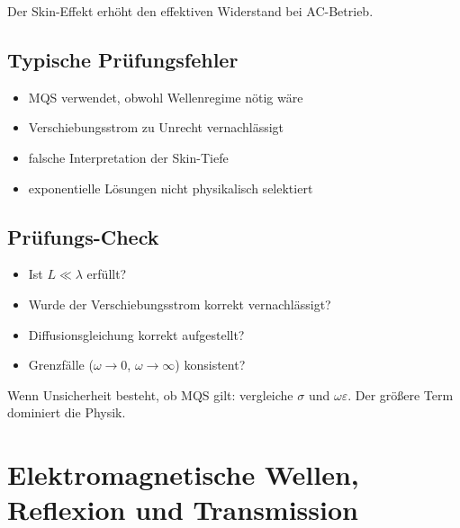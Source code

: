 \documentclass[a4paper]{article}
\newcommand{\eps}{\varepsilon}
\begin{document}
\begin{merke}
Der Skin-Effekt erhöht den effektiven Widerstand bei AC-Betrieb.
\end{merke}

\subsection{Typische Prüfungsfehler}

\begin{abwandlung}
\begin{itemize}
  \item MQS verwendet, obwohl Wellenregime nötig wäre
  \item Verschiebungsstrom zu Unrecht vernachlässigt
  \item falsche Interpretation der Skin-Tiefe
  \item exponentielle Lösungen nicht physikalisch selektiert
\end{itemize}
\end{abwandlung}

\subsection{Prüfungs-Check}

\begin{checkitem}
\begin{itemize}
  \item Ist $L\ll\lambda$ erfüllt?
  \item Wurde der Verschiebungsstrom korrekt vernachlässigt?
  \item Diffusionsgleichung korrekt aufgestellt?
  \item Grenzfälle ($\omega\to 0$, $\omega\to\infty$) konsistent?
\end{itemize}
\end{checkitem}

\begin{taktik}
Wenn Unsicherheit besteht, ob MQS gilt:
vergleiche $\sigma$ und $\omega\eps$.
Der größere Term dominiert die Physik.
\end{taktik}
\section{Elektromagnetische Wellen, Reflexion und Transmission}
\end{document}
